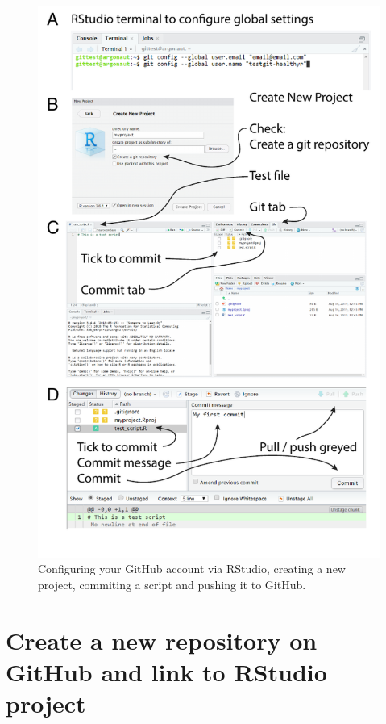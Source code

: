 \documentclass[
  12pt,
  krantz2]{krantz}
\begin{document}
\begin{figure}
\centering
\includegraphics{images/chapter14/4.pdf}
\caption{\label{fig:chap14-fig-globalsettings}Configuring your GitHub account via RStudio, creating a new project, commiting a script and pushing it to GitHub.}
\end{figure}

\hypertarget{create-a-new-repository-on-github-and-link-to-rstudio-project}{%
\section{Create a new repository on GitHub and link to RStudio project}\label{create-a-new-repository-on-github-and-link-to-rstudio-project}}
\end{document}
